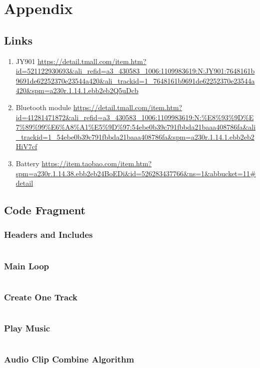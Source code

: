 \section{Appendix}

\subsection{Links}

\begin{enumerate}
\item JY901 
\url{https://detail.tmall.com/item.htm?id=521122930693&ali_refid=a3_430583_1006:1109983619:N:JY901:7648161b9691de62252370e23544a420&ali_trackid=1_7648161b9691de62252370e23544a420&spm=a230r.1.14.1.ebb2eb2Q5uDcb} 

\item  Bluetooth module 
\url{https://detail.tmall.com/item.htm?id=41281471872&ali_refid=a3_430583_1006:1109983619:N:%E8%93%9D%E7%89%99%E6%A8%A1%E5%9D%97:54ebe0b39c791fbbda21baaa408786fa&ali_trackid=1_54ebe0b39c791fbbda21baaa408786fa&spm=a230r.1.14.1.ebb2eb2HiV7cf}
\item  Battery 
\url{https://item.taobao.com/item.htm?spm=a230r.1.14.38.ebb2eb24BoEDi&id=526283437766&ns=1&abbucket=11#detail} 

\end{enumerate}

\newpage

\subsection{Code Fragment}

\subsubsection{Headers and Includes}
\inputminted{csharp}{scr/Headers.cs}


\subsubsection{Main Loop}
\inputminted{csharp}{scr/OnGui.cs}

\newpage

\subsubsection{Create One Track}
\inputminted{csharp}{scr/CreateOneTrack.cs}


\subsubsection{Play Music}
\inputminted{csharp}{scr/PlayMusic.cs}


\subsubsection{Audio Clip Combine Algorithm}
\inputminted{csharp}{scr/ACCombine.cs}










